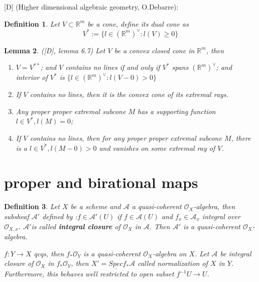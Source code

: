 \documentclass{article}
\newtheorem{defn}{Definition}[section]
\newtheorem{lem}[defn]{Lemma}
\begin{document}
[D] (Higher dimensional algebraic geometry, O.Debarre): 
\begin{defn}
	Let  $ V\subset \mathbb{R}^m $ be a cone, define its dual cone as 
	$$ V^*:=\{l\in (\mathbb{R}^m)^\vee :l(V)\geqslant 0\} $$
\end{defn}
\begin{lem}
	([D], lemma 6.7) Let $ V $ be a convex closed cone in $ \mathbb{R}^m $, then
	\begin{enumerate}
		\item $ V=V^{**} $; and $ V $ contains no lines if and only if $ V^* $ spans $ (\mathbb{R}^m)^\vee $; and interior of $ V^* $ is $ \{l\in (\mathbb{R}^m)^\vee :l(V-0)> 0\}  $
		\item If $ V $ contains no lines, then it is the convex cone of its extremal rays.
		\item Any proper proper extremal subcone $ M $ has a supporting function $ l\in V^*, l(M)=0 $;
		\item If $ V $ contains no lines, then for any proper proper extremal subcone $ M $, there is a $ l\in V^*, l(M-0)>0 $ and vanishes on some extremal ray of $ V $.
	\end{enumerate} 
\end{lem}




\section{proper and birational maps}

\begin{defn}
	Let $ X $ be a scheme and $ \mathcal{A} $ a quasi-coherent $ \mathcal{O}_X $-algebra, then subsheaf   $ \mathcal{A}' $  defined by :$ f\in \mathcal{A}'(U) $ if $ f\in \mathcal{A}(U) $ and $ f_x\in \mathcal{A}_x $ integral over $ \mathcal{O}_{X,x} $.  $ \mathcal{A}' $is called \textbf{integral closure} of  $ \mathcal{O}_X $ in $ \mathcal{A} $. Then $ \mathcal{A}' $ is a quasi-coherent $ \mathcal{O}_X $-algebra.  
	
	$ f:Y\to X $ qcqs, then $ f_*\mathcal{O}_Y $ is a quasi-coherent $ \mathcal{O}_X $-algebra on $ X $. Let $ \mathcal{A} $ be integral closure of $ \mathcal{O}_X $ in $ f_*\mathcal{O}_Y $, then $ X'=\underline{Spec}f_*\mathcal{A} $ called normalization of $ X $ in $ Y $. Furthermore, this behaves well restricted to open subset $ f^{-1}U\to U $.
\end{defn}
\end{document}
